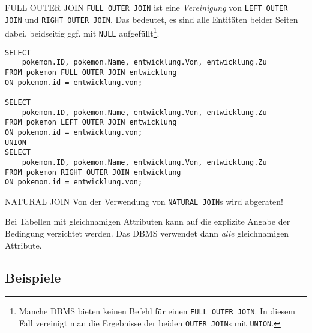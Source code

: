 \begin{sql}{FULL OUTER JOIN}
    \texttt{FULL OUTER JOIN} ist eine \emph{Vereinigung} von \texttt{LEFT OUTER JOIN} und \texttt{RIGHT OUTER JOIN}.
    Das bedeutet, es sind alle Entitäten beider Seiten dabei, beidseitig ggf. mit \texttt{NULL} aufgefüllt\footnote{
    Manche DBMS bieten keinen Befehl für einen \texttt{FULL OUTER JOIN}.
    In diesem Fall vereinigt man die Ergebnisse der beiden \texttt{OUTER JOIN}s mit \texttt{UNION}.}.

    \begin{verbatim}
SELECT
    pokemon.ID, pokemon.Name, entwicklung.Von, entwicklung.Zu
FROM pokemon FULL OUTER JOIN entwicklung
ON pokemon.id = entwicklung.von;

SELECT
    pokemon.ID, pokemon.Name, entwicklung.Von, entwicklung.Zu
FROM pokemon LEFT OUTER JOIN entwicklung
ON pokemon.id = entwicklung.von;
UNION
SELECT
    pokemon.ID, pokemon.Name, entwicklung.Von, entwicklung.Zu
FROM pokemon RIGHT OUTER JOIN entwicklung
ON pokemon.id = entwicklung.von;
    \end{verbatim}
\end{sql}

\begin{bonus}{NATURAL JOIN}
    Von der Verwendung von \texttt{NATURAL JOIN}s wird abgeraten!

    Bei Tabellen mit gleichnamigen Attributen kann auf die explizite Angabe der Bedingung verzichtet werden.
    Das DBMS verwendet dann \emph{alle} gleichnamigen Attribute.
\end{bonus}

\subsection{Beispiele}

